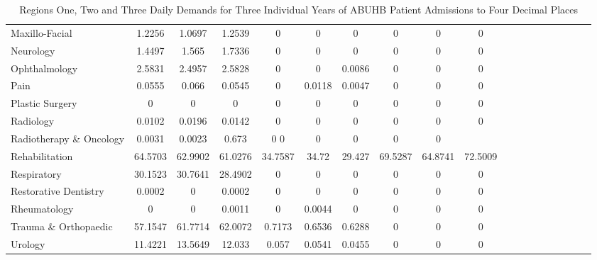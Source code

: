 \documentclass[../thesis.tex]{subfiles}
\begin{document}
\begin{landscape}
\begin{table}[h! ]
{\begin{tabular}{lcccccccccccccccccc}
Maxillo-Facial&1.2256	&1.0697	&1.2539&	0	&0	&0	&0&	0	&0\\
Neurology&1.4497	&1.565	&1.7336&	0&	0	&0&	0	&0	&0	\\
Ophthalmology  &2.5831	&2.4957	&2.5828&	0&	0	&0.0086	&0	&0&	0\\
Pain &0.0555	&0.066	&0.0545&	0&	0.0118	&0.0047	&0&	0	&0\\
Plastic Surgery&0	&0	&0	&0	&0&	0&	0	&0	&0\\
Radiology&0.0102	&0.0196	&0.0142	&0&	0&	0	&0	&0&	0\\
 Radiotherapy \& Oncology&0.0031	&0.0023	&0.673	&0	0	&0	&0	&0	&0\\
Rehabilitation&64.5703&	62.9902	&61.0276	&34.7587&	34.72&	29.427	&69.5287&	64.8741&	72.5009	\\
Respiratory&30.1523	&30.7641&	28.4902&	0	&0	&0	&0	&0	&0\\
Restorative Dentistry&0.0002	&0	&0.0002&	0	&0	&0	&0	&0	&0\\
Rheumatology&0	&0&	0.0011&	0	&0.0044&0	&0	&0	&0\\
Trauma \& Orthopaedic&57.1547	&61.7714&	62.0072&	0.7173	&0.6536&	0.6288&	0&	0	&0\\
Urology&11.4221	&13.5649&	12.033&	0.057	&0.0541&	0.0455&	0&	0	&0\\ \bottomrule

    \end{tabular}}
    \caption{Regions One, Two and Three Daily Demands for Three Individual Years of ABUHB Patient Admissions to Four Decimal Places}
    \label{tab:regionaldemandsexp2a}
\end{table}

\begin{table}[h! ]
    \centering{}
\end{table}
\end{landscape}
\end{document}
